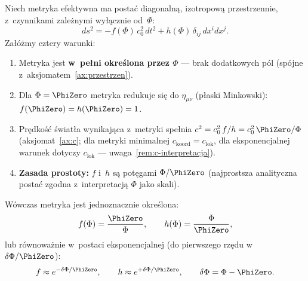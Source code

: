 \begin{proposition}\label{prop:conformal-unique}
Niech metryka efektywna ma posta\'c diagonaln\k{a}, izotropow\k{a}
przestrzennie, z~czynnikami zale\.znymi wy\l{}\k{a}cznie od~$\Phi$:
\begin{equation}\label{eq:diagonal-ansatz}
  ds^2 = -f(\Phi)\,c_0^2\,dt^2 + h(\Phi)\,\delta_{ij}\,dx^i dx^j.
\end{equation}
Za\l{}\'o\.zmy cztery warunki:
\begin{enumerate}[nosep]
  \item[(a)] Metryka jest \textbf{w~pe\l{}ni okre\'slona przez $\Phi$} ---
    brak dodatkowych p\'ol (sp\'ojne z~aksjomatem~\ref{ax:przestrzen}).
  \item[(b)] Dla $\Phi = \PhiZero$ metryka redukuje si\k{e} do
    $\eta_{\mu\nu}$ (p\l{}aski Minkowski): $f(\PhiZero) = h(\PhiZero) = 1$.
  \item[(c)] Pr\k{e}dko\'s\'c \'swiat\l{}a wynikaj\k{a}ca
    z~metryki spe\l{}nia
    $c^2 = c_0^2\,f/h = c_0^2\,\PhiZero/\Phi$
    (aksjomat~\ref{ax:c}; dla metryki minimalnej
    $c_{\mathrm{koord}} = c_{\mathrm{lok}}$, dla eksponencjalnej
    warunek dotyczy $c_{\mathrm{lok}}$ ---
    uwaga~\ref{rem:c-interpretacja}).
  \item[(d)] \textbf{Zasada prostoty:} $f$ i~$h$ s\k{a} pot\k{e}gami
    $\Phi/\PhiZero$ (najprostsza analityczna posta\'c
    zgodna z~interpretacj\k{a} $\Phi$ jako skali).
\end{enumerate}
W\'owczas metryka jest jednoznacznie okre\'slona:
\begin{equation}\label{eq:Omega-derived}
  f(\Phi) = \frac{\PhiZero}{\Phi}, \qquad
  h(\Phi) = \frac{\Phi}{\PhiZero},
\end{equation}
lub r\'ownowa\.znie w~postaci eksponencjalnej
(do pierwszego rz\k{e}du w~$\delta\Phi/\PhiZero$):
\begin{equation}\label{eq:Omega-exp}
  f \approx e^{-\delta\Phi/\PhiZero}, \qquad
  h \approx e^{+\delta\Phi/\PhiZero}, \qquad
  \delta\Phi = \Phi - \PhiZero.
\end{equation}
\end{proposition}


